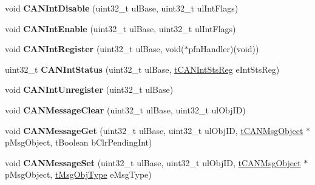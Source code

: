 \begin{DoxyCompactItemize}
\item 
void {\bfseries C\+A\+N\+Int\+Disable} (uint32\+\_\+t ul\+Base, uint32\+\_\+t ul\+Int\+Flags)\hypertarget{group__can__api_ga5b7a19ea95b3223053b9befcf08a616d}{}\label{group__can__api_ga5b7a19ea95b3223053b9befcf08a616d}

\item 
void {\bfseries C\+A\+N\+Int\+Enable} (uint32\+\_\+t ul\+Base, uint32\+\_\+t ul\+Int\+Flags)\hypertarget{group__can__api_ga1b44b0814917b67cd28882e735bdf17a}{}\label{group__can__api_ga1b44b0814917b67cd28882e735bdf17a}

\item 
void {\bfseries C\+A\+N\+Int\+Register} (uint32\+\_\+t ul\+Base, void($\ast$pfn\+Handler)(void))\hypertarget{group__can__api_ga251f6f4d6fd75d80d5439ce96bd80069}{}\label{group__can__api_ga251f6f4d6fd75d80d5439ce96bd80069}

\item 
uint32\+\_\+t {\bfseries C\+A\+N\+Int\+Status} (uint32\+\_\+t ul\+Base, \hyperlink{group__can__api_ga73584383f566e98bf822b371a03becfc}{t\+C\+A\+N\+Int\+Sts\+Reg} e\+Int\+Sts\+Reg)\hypertarget{group__can__api_ga2646a8a39363eab7bc1f3f4a6980e048}{}\label{group__can__api_ga2646a8a39363eab7bc1f3f4a6980e048}

\item 
void {\bfseries C\+A\+N\+Int\+Unregister} (uint32\+\_\+t ul\+Base)\hypertarget{group__can__api_ga1bc0cb97655af0296f283d6410e00f33}{}\label{group__can__api_ga1bc0cb97655af0296f283d6410e00f33}

\item 
void {\bfseries C\+A\+N\+Message\+Clear} (uint32\+\_\+t ul\+Base, uint32\+\_\+t ul\+Obj\+ID)\hypertarget{group__can__api_ga5c64ee3b2e0839bc0aad5f2d716ddc57}{}\label{group__can__api_ga5c64ee3b2e0839bc0aad5f2d716ddc57}

\item 
void {\bfseries C\+A\+N\+Message\+Get} (uint32\+\_\+t ul\+Base, uint32\+\_\+t ul\+Obj\+ID, \hyperlink{structtCANMsgObject}{t\+C\+A\+N\+Msg\+Object} $\ast$p\+Msg\+Object, t\+Boolean b\+Clr\+Pending\+Int)\hypertarget{group__can__api_ga79e75c0930e75fd7e58a337c781ad4a5}{}\label{group__can__api_ga79e75c0930e75fd7e58a337c781ad4a5}

\item 
void {\bfseries C\+A\+N\+Message\+Set} (uint32\+\_\+t ul\+Base, uint32\+\_\+t ul\+Obj\+ID, \hyperlink{structtCANMsgObject}{t\+C\+A\+N\+Msg\+Object} $\ast$p\+Msg\+Object, \hyperlink{group__can__api_gad3fa840d5e84a9366ba2a8c958c069a2}{t\+Msg\+Obj\+Type} e\+Msg\+Type)\hypertarget{group__can__api_ga79cb2284660acd82feb1d24d91dbe5a2}{}\label{group__can__api_ga79cb2284660acd82feb1d24d91dbe5a2}


\end{DoxyCompactItemize}
